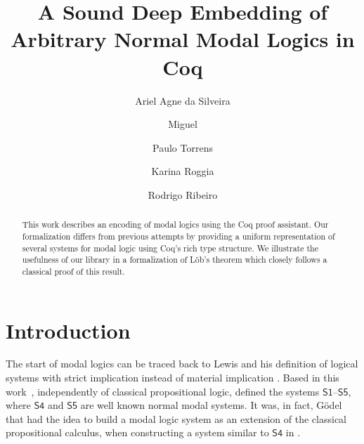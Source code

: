 \documentclass[sigconf,anonymous]{acmart}
\begin{document}
\title{A Sound Deep Embedding of Arbitrary Normal Modal Logics in Coq}

\author{Ariel Agne da Silveira}
\author{Miguel}
\author{Paulo Torrens}
\author{Karina Roggia}
\author{Rodrigo Ribeiro}

\renewcommand{\shortauthors}{da Silveira et al.}

\begin{abstract}
  This work describes an encoding of modal logics using the Coq proof assistant.
  Our formalization differs from previous attempts by providing a uniform
  representation of several systems for modal logic using Coq's rich type
  structure. We illustrate the usefulness of our library in a formalization of
  L\"ob's theorem which closely follows a classical proof of this result.
\end{abstract}



\maketitle

\section{Introduction}\label{sec:intro}


The start of modal logics can be traced back to Lewis and his definition of 
logical systems with strict implication instead of material implication \cite{Lewis1918}.
Based in this work~\cite{Lewis1932}, independently of classical propositional logic,
defined the systems $\mathsf{S1}$--$\mathsf{S5}$, where $\mathsf{S4}$ and $\mathsf{S5}$
are well known normal modal systems. It was, in fact, G{\"o}del that had the idea 
to build a modal logic system as an extension of the classical propositional calculus, 
when constructing a system similar to $\mathsf{S4}$ in \cite{Godel1933}.
\end{document}
